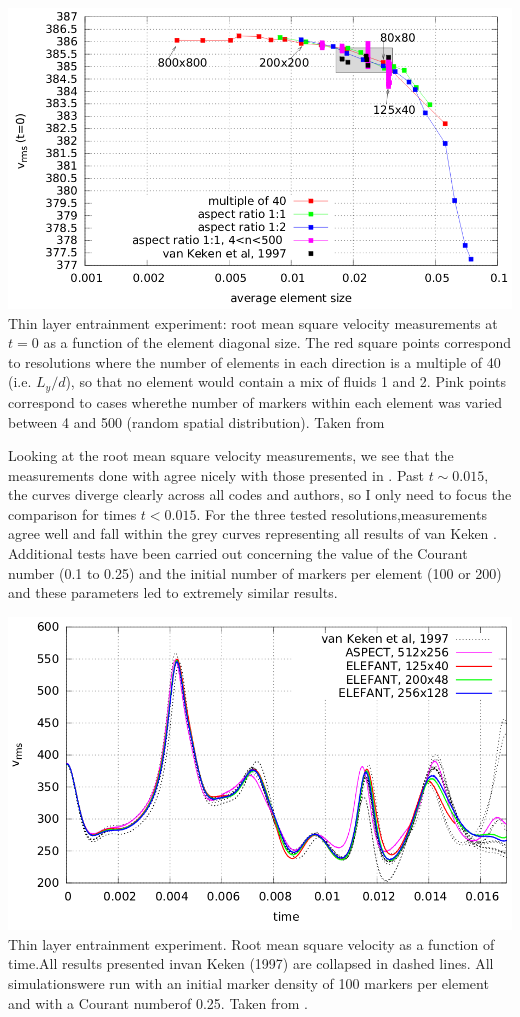 \begin{center}
\includegraphics[width=0.65\linewidth]{images/benchmark_thinlayer/thie14}\\
{\scriptsize 
Thin layer entrainment experiment: root mean square velocity measurements at
$t=0$ as a function of the element diagonal size. 
The red square points correspond to resolutions where the number of elements in each direction 
is a multiple of 40 (i.e. $L_y/d$), so that no element would contain a mix of fluids 1 and 2. 
Pink points correspond to cases wherethe number of markers within each element was varied between 4 and 500 
(random spatial distribution). Taken from \cite{thie14}}
\end{center}


Looking at the root mean square velocity measurements, we see that
the measurements done with \elefant agree nicely with those presented in \cite{vaks97}. 
Past $t\sim0.015$, the curves diverge clearly across all codes and authors, 
so I only need to focus the comparison for times $t <0.015$. 
For the three tested resolutions,measurements agree well and fall within the grey curves 
representing all results of van Keken \etal. 
Additional tests have been carried out concerning the value of the
Courant number (0.1 to 0.25) and the initial number of markers per element (100 or 200) 
and these parameters led to extremely similar results.

\begin{center}
\includegraphics[width=0.65\linewidth]{images/benchmark_thinlayer/thie14b}\\
{\scriptsize Thin layer entrainment experiment. Root mean square velocity as a function of time.All results presented invan Keken \etal (1997) are collapsed in dashed lines. All simulationswere run with an initial marker density of 100 markers per element and with a Courant numberof 0.25. Taken from \cite{thie14}.}
\end{center}

